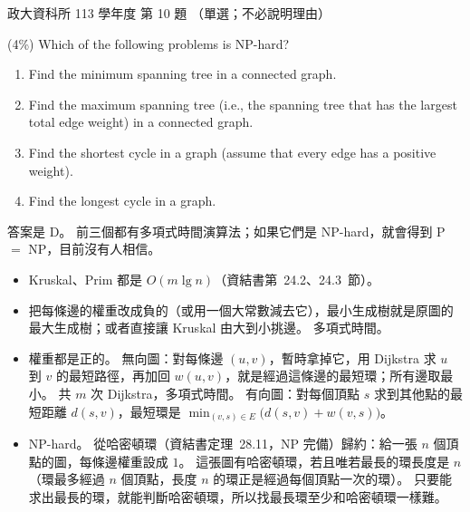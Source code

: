 \begin{pastexam}[label={px:nccu-113-dsa-10}]{政大資科所 113 學年度 第 10 題}
（單選；不必說明理由）

(4\%) Which of the following problems is NP-hard?
\begin{enumerate}[label=\Alph*.]
\item Find the minimum spanning tree in a connected graph.
\item Find the maximum spanning tree (i.e., the spanning tree that has the largest total edge weight) in a
connected graph.
\item Find the shortest cycle in a graph (assume that every edge has a positive weight).
\item Find the longest cycle in a graph.
\end{enumerate}
\end{pastexam}

\begin{pastsoln}
答案是 D。 前三個都有多項式時間演算法；如果它們是 NP-hard，就會得到 P $=$ NP，目前沒有人相信。

\begin{itemize}
\item[A.] Kruskal、Prim 都是 $O(m \lg n)$（資結書第~24.2、24.3~節）。
\item[B.] 把每條邊的權重改成負的（或用一個大常數減去它），最小生成樹就是原圖的最大生成樹；或者直接讓 Kruskal
由大到小挑邊。 多項式時間。
\item[C.] 權重都是正的。 無向圖：對每條邊 $(u, v)$，暫時拿掉它，用 Dijkstra 求 $u$ 到 $v$ 的最短路徑，再加回
$w(u, v)$，就是經過這條邊的最短環；所有邊取最小。 共 $m$ 次 Dijkstra，多項式時間。 有向圖：對每個頂點 $s$
求到其他點的最短距離 $d(s, v)$，最短環是 $\min_{(v, s) \in E} \bigl(d(s, v) + w(v, s)\bigr)$。
\item[D.] NP-hard。 從哈密頓環（資結書定理~28.11，NP 完備）歸約：給一張 $n$ 個頂點的圖，每條邊權重設成 $1$。
這張圖有哈密頓環，若且唯若最長的環長度是 $n$（環最多經過 $n$ 個頂點，長度 $n$ 的環正是經過每個頂點一次的環）。
只要能求出最長的環，就能判斷哈密頓環，所以找最長環至少和哈密頓環一樣難。
\end{itemize}
\end{pastsoln}
